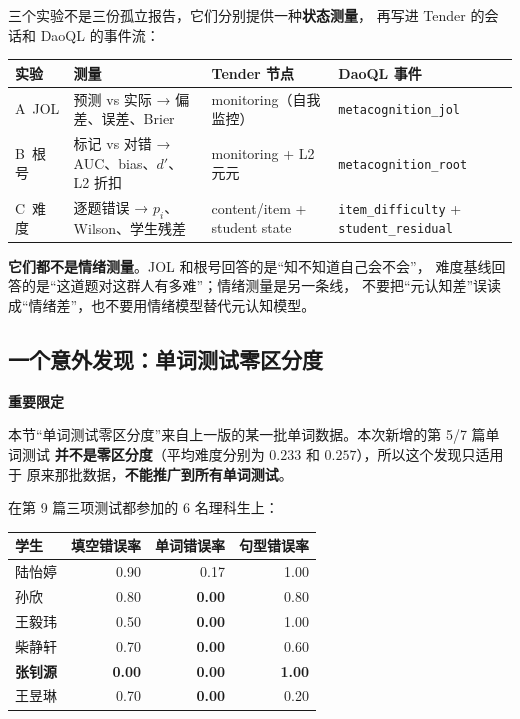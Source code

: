 \documentclass[UTF8,a4paper,11pt]{ctexart}
\newenvironment{explainbox}[1]
{\begin{center}\begin{minipage}{0.94\textwidth}\colorbox{boxbg}{\parbox{0.92\textwidth}{\textbf{#1}\par\vspace{2pt}}}}
{\end{minipage}\end{center}}
\begin{document}
三个实验不是三份孤立报告，它们分别提供一种\textbf{状态测量}，
再写进 Tender 的会话和 DaoQL 的事件流：

\begin{center}
\begin{longtable}{@{}p{2.6cm}p{4.1cm}p{3.6cm}p{4.0cm}@{}}
\toprule
\textbf{实验} & \textbf{测量} & \textbf{Tender 节点} & \textbf{DaoQL 事件} \\
\midrule
A\ JOL & 预测 vs 实际 → 偏差、误差、Brier & monitoring（自我监控） & \texttt{metacognition\_jol} \\
B\ 根号 & 标记 vs 对错 → AUC、bias、$d'$、L2 折扣 & monitoring + L2 元元 & \texttt{metacognition\_root} \\
C\ 难度 & 逐题错误 → $p_i$、Wilson、学生残差 & content/item + student state & \texttt{item\_difficulty} + \texttt{student\_residual} \\
\bottomrule
\end{longtable}
\end{center}

\textbf{它们都不是情绪测量}。JOL 和根号回答的是“知不知道自己会不会”，
难度基线回答的是“这道题对这群人有多难”；情绪测量是另一条线，
不要把“元认知差”误读成“情绪差”，也不要用情绪模型替代元认知模型。

\subsection{一个意外发现：单词测试零区分度}

\begin{explainbox}{重要限定}
本节“单词测试零区分度”来自上一版的某一批单词数据。本次新增的第 5/7 篇单词测试
\textbf{并不是零区分度}（平均难度分别为 $0.233$ 和 $0.257$），所以这个发现只适用于
原来那批数据，\textbf{不能推广到所有单词测试}。
\end{explainbox}

在第 9 篇三项测试都参加的 6 名理科生上：

\begin{center}
\begin{tabular}{lrrr}
\toprule
\textbf{学生} & \textbf{填空错误率} & \textbf{单词错误率} & \textbf{句型错误率} \\
\midrule
陆怡婷 & 0.90 & 0.17 & 1.00 \\
孙欣 & 0.80 & \textbf{0.00} & 0.80 \\
王毅玮 & 0.50 & \textbf{0.00} & 1.00 \\
柴静轩 & 0.70 & \textbf{0.00} & 0.60 \\
\textbf{张钊源} & \textbf{0.00} & \textbf{0.00} & \textbf{1.00} \\
王昱琳 & 0.70 & \textbf{0.00} & 0.20 \\
\bottomrule
\end{tabular}
\end{center}
\end{document}
